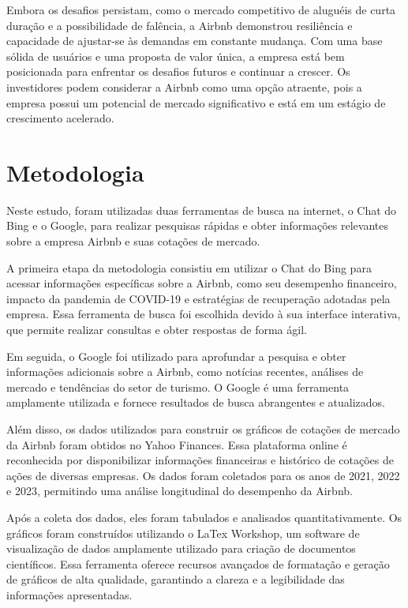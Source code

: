 \documentclass{article}
\begin{document}
Embora os desafios persistam, como o mercado competitivo de aluguéis de curta duração e a possibilidade de falência, a Airbnb demonstrou resiliência e capacidade de ajustar-se às demandas em constante mudança. Com uma base sólida de usuários e uma proposta de valor única, a empresa está bem posicionada para enfrentar os desafios futuros e continuar a crescer. Os investidores podem considerar a Airbnb como uma opção atraente, pois a empresa possui um potencial de mercado significativo e está em um estágio de crescimento acelerado.
\newpage
    \section*{Metodologia}
Neste estudo, foram utilizadas duas ferramentas de busca na internet, o Chat do Bing e o Google, para realizar pesquisas rápidas e obter informações relevantes sobre a empresa Airbnb e suas cotações de mercado.

A primeira etapa da metodologia consistiu em utilizar o Chat do Bing para acessar informações específicas sobre a Airbnb, como seu desempenho financeiro, impacto da pandemia de COVID-19 e estratégias de recuperação adotadas pela empresa. Essa ferramenta de busca foi escolhida devido à sua interface interativa, que permite realizar consultas e obter respostas de forma ágil.

Em seguida, o Google foi utilizado para aprofundar a pesquisa e obter informações adicionais sobre a Airbnb, como notícias recentes, análises de mercado e tendências do setor de turismo. O Google é uma ferramenta amplamente utilizada e fornece resultados de busca abrangentes e atualizados.

Além disso, os dados utilizados para construir os gráficos de cotações de mercado da Airbnb foram obtidos no Yahoo Finances. Essa plataforma online é reconhecida por disponibilizar informações financeiras e histórico de cotações de ações de diversas empresas. Os dados foram coletados para os anos de 2021, 2022 e 2023, permitindo uma análise longitudinal do desempenho da Airbnb.

Após a coleta dos dados, eles foram tabulados e analisados quantitativamente. Os gráficos foram construídos utilizando o LaTex Workshop, um software de visualização de dados amplamente utilizado para criação de documentos científicos. Essa ferramenta oferece recursos avançados de formatação e geração de gráficos de alta qualidade, garantindo a clareza e a legibilidade das informações apresentadas.
\end{document}
